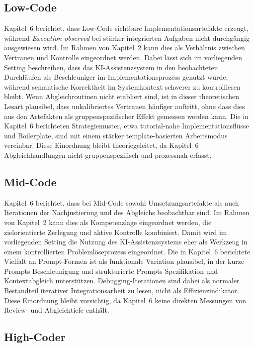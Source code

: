 \subsection{Low-Code}
\label{sec:discussion_low_code}

Kapitel~6 berichtet, dass Low-Code sichtbare Implementationsartefakte erzeugt, w\"ahrend \textit{Execution observed} bei st\"arker integrierten Aufgaben nicht durchg\"angig ausgewiesen wird.
Im Rahmen von Kapitel~2 kann dies als Verh\"altnis zwischen Vertrauen und Kontrolle eingeordnet werden.
Dabei l\"asst sich im vorliegenden Setting beschreiben, dass das KI-Assistenzsystem in den beobachteten Durchl\"aufen als Beschleuniger im Implementationsprozess genutzt wurde, w\"ahrend semantische Korrektheit im Systemkontext schwerer zu kontrollieren bleibt.
Wenn Abgleichroutinen nicht etabliert sind, ist in dieser theoretischen Lesart plausibel, dass unkalibriertes Vertrauen h\"aufiger auftritt, ohne dass dies aus den Artefakten als gruppenspezifischer Effekt gemessen werden kann.
Die in Kapitel~6 berichteten Strategiemuster, etwa tutorial-nahe Implementationsfl\"usse und Boilerplate, sind mit einem st\"arker template-basierten Arbeitsmodus vereinbar.
Diese Einordnung bleibt theoriegeleitet, da Kapitel~6 Abgleichhandlungen nicht gruppenspezifisch und prozessnah erfasst.

\subsection{Mid-Code}
\label{sec:discussion_mid_code}

Kapitel~6 berichtet, dass bei Mid-Code sowohl Umsetzungsartefakte als auch Iterationen der Nachjustierung und des Abgleichs beobachtbar sind.
Im Rahmen von Kapitel~2 kann dies als Kompetenzlage eingeordnet werden, die zielorientierte Zerlegung und aktive Kontrolle kombiniert.
Damit wird im vorliegenden Setting die Nutzung des KI-Assistenzsystems eher als Werkzeug in einem kontrollierten Probleml\"oseprozess eingeordnet.
Die in Kapitel~6 berichtete Vielfalt an Prompt-Formen ist als funktionale Variation plausibel, in der kurze Prompts Beschleunigung und strukturierte Prompts Spezifikation und Kontextabgleich unterst\"utzen.
Debugging-Iterationen sind dabei als normaler Bestandteil iterativer Integrationsarbeit zu lesen, nicht als Effizienzindikator.
Diese Einordnung bleibt vorsichtig, da Kapitel~6 keine direkten Messungen von Review- und Abgleichtiefe enth\"alt.

\subsection{High-Coder}
\label{sec:discussion_high_code}

